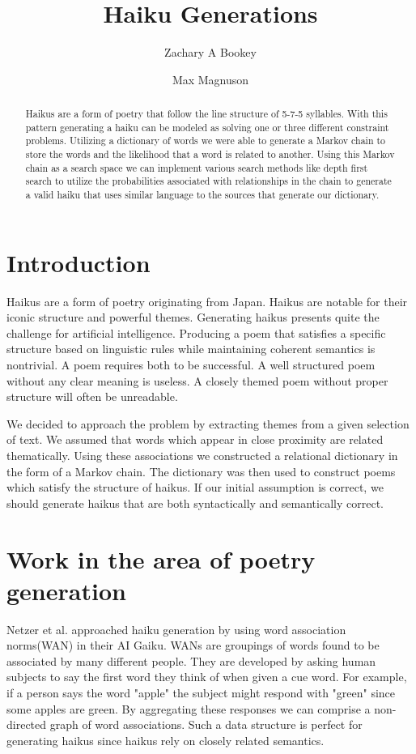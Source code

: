 \documentclass[]{article}
\title{Haiku Generations}
\author{Zachary A Bookey \and Max Magnuson}
\begin{document}
\maketitle

\begin{abstract}
Haikus are a form of poetry that follow the line structure of 5-7-5 syllables. With this pattern generating a haiku can be modeled as solving one or three different constraint problems. Utilizing a dictionary of words we were able to generate a Markov chain to store the words and the likelihood that a word is related to another. Using this Markov chain as a search space we can implement various search methods like depth first search to utilize the probabilities associated with relationships in the chain to generate a valid haiku that uses similar language to the sources that generate our dictionary.
\end{abstract}

\section{Introduction}
Haikus are a form of poetry originating from Japan\cite{Gaiku}. Haikus are notable for their iconic structure and powerful themes. Generating haikus presents quite the challenge for artificial intelligence. Producing a poem that satisfies a specific structure based on linguistic rules while maintaining coherent semantics is nontrivial. A poem requires both to be successful. A well structured poem without any clear meaning is useless. A closely themed poem without proper structure will often be unreadable.

We decided to approach the problem by extracting themes from a given selection of text. We assumed that words which appear in close proximity are related thematically. Using these associations we constructed a relational dictionary in the form of a Markov chain. The dictionary was then used to construct poems which satisfy the structure of haikus. If our initial assumption is correct, we should generate haikus that are both syntactically and semantically correct.

\section{Work in the area of poetry generation}
Netzer et al. approached haiku generation by using word association norms(WAN) in their AI Gaiku\cite{Gaiku}. WANs are groupings of words found to be associated by many different people. They are developed by asking human subjects to say the first word they think of when given a cue word. For example, if a person says the word "apple" the subject might respond with "green" since some apples are green. By aggregating these responses we can comprise a non-directed graph of word associations. Such a data structure is perfect for generating haikus since haikus rely on closely related semantics.
\end{document}
